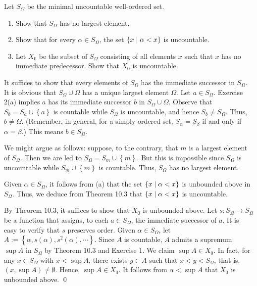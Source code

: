 \documentclass[a4paper,12pt]{article}
\begin{document}
\begin{exe}
	Let \( S_{\Omega} \) be the minimal uncountable well-ordered set.
	\begin{enumerate}
		\item
		      Show that \( S_{\Omega} \) has no largest element.
		      
		\item
		      Show that for every \( \alpha \in S_{\Omega} \),
		      the set \( \left\{ x \;|\; \alpha < x \right\} \)
		      is uncountable.
		      
		\item
		      Let \( X_0 \) be the subset of  \( S_{\Omega} \) consisting of all elements
		      \( x \) such that \( x \) has no immediate predecessor.
		      Show that \( X_0 \) is uncountable.
	\end{enumerate}
\end{exe}
\begin{sol}\leavevmode \par
	It suffices to show that
	every elements of \( S_{\Omega} \) has the immediate successor in \( S_{\Omega} \).
	It is obvious that \( S_{\Omega}\cup \Omega \) has a unique largest element \( \Omega \).
	Let \( a\in S_{\Omega} \).
	Exercise 2(a) implies \( a \) has its immediate successor \( b \) in \( S_{\Omega}\cup \Omega \).
	Observe that 
	\( S_{b} = S_{a}\cup \left\{ a \right\} \) is countable
	while
	\( S_{\Omega} \)
	is uncountable,
	and hence 
	\( S_{b}\neq S_{\Omega} \).
	Thus, \( b \neq \Omega \).
	(Remember, in general, for a simply ordered set,
	\( S_{\alpha} = S_{\beta}\) if and only if \( \alpha = \beta \).)
	This means \( b \in S_{\Omega} \).
	
	We might argue as follows:
	suppose, to the contrary, that \( m \) is a largest element of \( S_{\Omega} \).
	Then we are led to \( S_{\Omega} = S_{m} \cup \left\{ m \right\}\).
	But this is impossible since \( S_{\Omega} \) is uncountable while 
	\( S_{m} \cup \left\{ m \right\}\) is countable.
	Thus, \( S_{\Omega} \) has no largest element.
	
	Given \( \alpha \in S_{\Omega}\),
	it follows from (a) that
	the set \( \left\{ x \;|\; \alpha < x \right\} \)
	is unbounded above in \( S_{\Omega} \).
	Thus, we deduce from Theorem 10.3 that
	\( \left\{ x \;|\; \alpha < x \right\} \)
	is uncountable.
	
	By Theorem 10.3,
	it suffices to show that \( X_0 \) is unbounded above.
	Let \( s: S_{\Omega} \to S_{\Omega} \) be a function that
	assigns, to each \( a\in S_{\Omega} \), the immediate successor of \( a \).
	It is easy to verify that \( s \) preserves order.
	Given \( \alpha \in S_{\Omega} \),
	let
	\( A:=\left\{ \alpha, s(\alpha), s^2(\alpha),\cdots \right\} \).
	Since \( A \) is countable,
	\( A \) admits a supremum \( \sup{A} \) in \( S_{\Omega} \)
	by Theorem 10.3 and Exercise 1.
	We claim \( \sup{A} \in X_0 \).
	In fact, for any \(  x \in S_{\Omega} \) with \( x< \sup{A} \),
	there exists \( y \in A \)
	such that \( x<y<S_{\Omega} \), that is,
	\( \left( x, \sup{A}\right) \neq \emptyset \).
	Hence, \( \sup{A}\in X_0 \).
	It follows from \( \alpha < \sup{A} \) that \( X_0 \) is unbounded above.
	\qed\end{sol}
\end{document}
